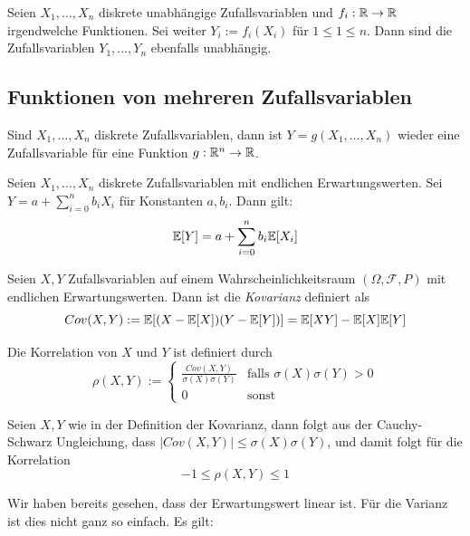 \begin{satz}
Seien $X_1,\dots, X_n$ diskrete unabhängige Zufallsvariablen und $f_i :\mathbb{R} \to \mathbb{R}$ irgendwelche Funktionen. Sei weiter $Y_i := f_i(X_i)$ für $ 1 \leq 1 \leq n$. Dann sind die Zufallsvariablen $Y_1,\dots, Y_n$ ebenfalls unabhängig.
\end{satz}

\subsection{Funktionen von mehreren Zufallsvariablen}
Sind $X_1,\dots,X_n$ diskrete Zufallsvariablen, dann ist $Y = g(X_1,\dots,X_n)$ wieder eine Zufallsvariable für eine Funktion $g:\mathbb{R}^n \to \mathbb{R}$.

\begin{satz}
Seien $X_1,\dots,X_n$ diskrete Zufallsvariablen mit endlichen Erwartungswerten. Sei $Y = a + \sum_{i=0}^n  b_i X_i$ für Konstanten $a,b_i$. Dann gilt:
$$ \mathbb{E}[Y] = a + \sum_{i = 0}^n b_i \mathbb{E}[X_i]$$
\end{satz}

\begin{definition}
Seien $X,Y$ Zufallsvariablen auf einem Wahrscheinlichkeitsraum $(\Omega, \mathcal{F}, P)$ mit endlichen Erwartungswerten. Dann ist die \textit{Kovarianz} definiert als
$$ Cov(X,Y) := \mathbb{E}[(X-\mathbb{E}[X])(Y-\mathbb{E}[Y])] = \mathbb{E}[XY] - \mathbb{E}[X]\mathbb{E}[Y]$$
\end{definition}

\begin{definition}
Die Korrelation von $X$ und $Y$ ist definiert durch
$$ \rho(X,Y) := \begin{cases} \frac{Cov(X,Y)}{\sigma(X)\sigma(Y)} & \mbox{falls } \sigma(X)\sigma(Y) > 0 \\ 0 & \mbox{sonst} \end{cases}$$
\end{definition}

\begin{satz}
Seien $X,Y$ wie in der Definition der Kovarianz, dann folgt aus der Cauchy-Schwarz Ungleichung, dass $|Cov(X,Y)| \leq \sigma(X)\sigma(Y)$, und damit folgt für die Korrelation
$$ -1 \leq \rho(X,Y) \leq 1$$
\end{satz}

Wir haben bereits gesehen, dass der Erwartungswert linear ist. Für die Varianz ist dies nicht ganz so einfach. Es gilt:

